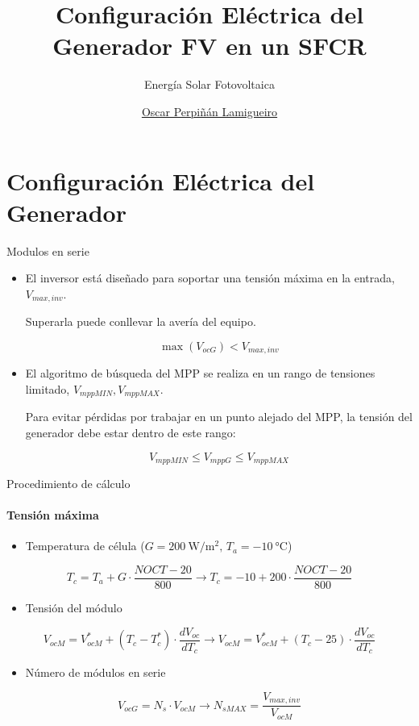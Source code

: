 \documentclass[aspectratio=169, usenames,svgnames,dvipsnames]{beamer}
\author{\href{https://oscarperpinan.github.io}{Oscar Perpiñán Lamigueiro}}
\date{}
\title{Configuración Eléctrica del Generador FV en un SFCR}
\subtitle{Energía Solar Fotovoltaica}
\institute[UPM]{Universidad Politécnica de Madrid}
\begin{document}
\maketitle

\section{Configuración Eléctrica del Generador}
\label{sec:org4f2be15}

\begin{frame}[label={sec:orgf4c320d}]{Modulos en serie}
\begin{itemize}
\item El inversor está diseñado para soportar una \alert{tensión máxima en la
entrada}, \(V_{max,inv}\).

Superarla puede conllevar la \alert{avería} del equipo.

\[
  \max(V_{ocG}) < V_{max,inv}
\]
\item El algoritmo de \alert{búsqueda del MPP} se realiza en un
rango de tensiones limitado, \(V_{mppMIN}, V_{mppMAX}\).

Para \alert{evitar pérdidas} por trabajar en un punto alejado del MPP, la tensión del generador debe estar dentro de este rango:

\[
  V_{mppMIN} \leq V_{mppG} \leq V_{mppMAX}
\]
\end{itemize}
\end{frame}
\begin{frame}[label={sec:org00a7af0}]{Procedimiento de cálculo}
\framesubtitle{Tensión máxima}

\begin{itemize}
\item Temperatura de célula (\(G=\SI{200}{\watt\per\meter\squared},\, T_{a}=\SI{-10}{\celsius}\))
\end{itemize}
\[
  T_{c} = T_{a} + G \cdot \frac{NOCT-20}{800} \rightarrow   T_{c} = -10 + 200 \cdot \frac{NOCT-20}{800}
\]

\begin{itemize}
\item Tensión del módulo
\end{itemize}
\[
  V_{ocM} = V_{ocM}^{*} + (T_{c}-T_{c}^{*})\cdot\frac{dV_{oc}}{dT_{c}} \rightarrow V_{ocM} = V_{ocM}^{*} + (T_{c}- 25)\cdot\frac{dV_{oc}}{dT_{c}}
\]
\begin{itemize}
\item Número de módulos en serie
\end{itemize}
\[
      V_{ocG} = N_s \cdot V_{ocM} \rightarrow N_{sMAX}=\frac{V_{max,inv}}{V_{ocM}}
\]
\end{frame}
\end{document}
